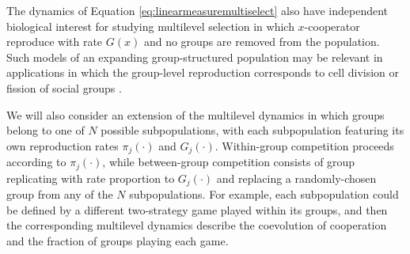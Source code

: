 \documentclass[11pt]{article}
\numberwithin{equation}{section}
\begin{document}
{The dynamics of Equation \eqref{eq:linearmeasuremultiselect} also have independent biological interest for studying multilevel selection in which $x$-cooperator reproduce with rate $G(x)$ and no groups are removed from the population. Such models of an expanding group-structured population may be relevant in applications in which the group-level reproduction corresponds to cell division \cite{fontanari2006coexistence,fontanari2013solvable,fontanari2014effect,fontanari2014nonlinear} or fission of social groups \cite{simon2016group,gueron1995dynamics}.

We will also consider an extension of the multilevel dynamics in which groups belong to one of $N$ possible subpopulations, with each subpopulation featuring its own reproduction rates $\pi_j(\cdot)$ and $G_j(\cdot)$. Within-group competition proceeds according to $\pi_j(\cdot)$, while between-group competition consists of group replicating with rate proportion to $G_j(\cdot)$ and replacing a randomly-chosen group from any of the $N$ subpopulations. For example, each subpopulation could be defined by a different two-strategy game played within its groups, and then the corresponding multilevel dynamics describe the coevolution of cooperation and the fraction of groups playing each game. 
 
}
\end{document}
